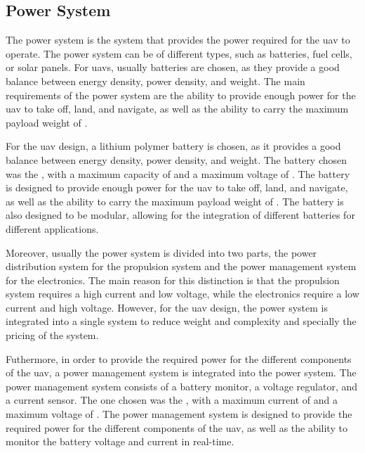 
\subsection{Power System}

The power system is the system that provides the power required for the \gls{uav} to operate. The power system can be of different types, such as batteries, fuel cells, or solar panels. For \glspl{uav}, usually batteries are chosen, as they provide a good balance between energy density, power density, and weight. The main requirements of the power system are the ability to provide enough power for the \gls{uav} to take off, land, and navigate, as well as the ability to carry the maximum payload weight of .

For the \gls{uav} design, a lithium polymer battery is chosen, as it provides a good balance between energy density, power density, and weight. The battery chosen was the , with a maximum capacity of  and a maximum voltage of . The battery is designed to provide enough power for the \gls{uav} to take off, land, and navigate, as well as the ability to carry the maximum payload weight of . The battery is also designed to be modular, allowing for the integration of different batteries for different applications.


Moreover, usually the power system is divided into two parts, the power distribution system for the propulsion system and the power management system for the electronics. The main reason for this distinction is that the propulsion system requires a high current and low voltage, while the electronics require a low current and high voltage. However, for the \gls{uav} design, the power system is integrated into a single system to reduce weight and complexity and specially the pricing of the system.

Futhermore, in order to provide the required power for the different components of the \gls{uav}, a power management system is integrated into the power system. The power management system consists of a battery monitor, a voltage regulator, and a current sensor. The one chosen was the , with a maximum current of  and a maximum voltage of . The power management system is designed to provide the required power for the different components of the \gls{uav}, as well as the ability to monitor the battery voltage and current in real-time.

